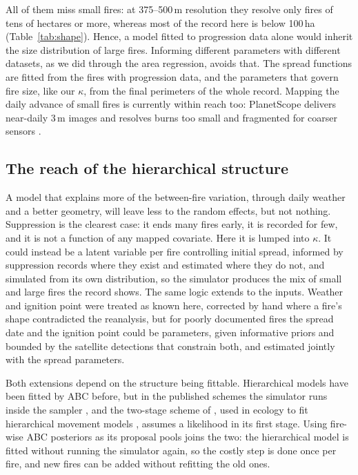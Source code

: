\documentclass[ResearchPaper,linenum]{CSIRO_LaTeX_Template}
\begin{document}
All of them miss small fires: at 375--500\,m resolution they resolve only fires of tens
of hectares or more, whereas most of the record here is below 100\,ha
(Table~\ref{tab:shape}). Hence, a model fitted to progression data alone would inherit the
size distribution of large fires. Informing different parameters with different datasets,
as we did through the area regression, avoids that. The spread functions are fitted from the fires
with progression data, and the parameters that govern fire size, like our $\kappa$, from
the final perimeters of the whole record. Mapping the daily advance of small fires is currently
within reach too: PlanetScope delivers near-daily 3\,m images and resolves burns too
small and fragmented for coarser sensors \citep{martins_deep_2022}.

\subsection*{The reach of the hierarchical structure}

A model that explains more of the between-fire variation, through daily weather and a
better geometry, will leave less to the random effects, but not nothing. Suppression is
the clearest case: it ends many fires early, it is recorded for few, and it is not a
function of any mapped covariate. Here it is lumped into $\kappa$. It could instead be a latent
variable per fire controlling initial spread, informed by suppression records where they
exist and estimated where they do not, and simulated from its own distribution, so the
simulator produces the mix of small and large fires the record shows. The same logic extends to the inputs. Weather and
ignition point were treated as known here, corrected by hand where a fire's shape
contradicted the reanalysis, but for poorly documented fires the spread date and the
ignition point could be parameters, given informative priors and bounded by the
satellite detections that constrain both, and estimated jointly with the spread
parameters.

Both extensions depend on the structure being fittable. Hierarchical models have
been fitted by ABC before, but in the published schemes the simulator runs inside the
sampler \citep{bazin2010likelihood, turner2014hierarchical, clarte2021componentwise}, and
the two-stage scheme of \citet{lunn2013fully}, used in ecology to fit hierarchical movement
models \citep{hooten2016hierarchical}, assumes a likelihood in its first stage. Using
fire-wise ABC posteriors as its proposal pools joins the two: the hierarchical model is
fitted without running the simulator again, so the costly step is done once per fire, and
new fires can be added without refitting the old ones.
\end{document}
